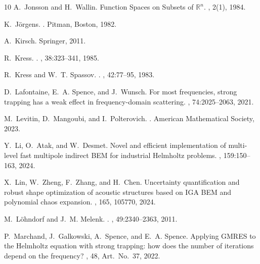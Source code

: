 \documentclass{birkjour}
\theoremstyle{definition}
\theoremstyle{remark}
\numberwithin{equation}{section}
\begin{document}
\begin{thebibliography}{10}
A.~Jonsson and H.~Wallin.
\newblock Function {S}paces on {S}ubsets of {${\mathbb R}^n$}.
, 2(1), 1984.

K.~J\"orgens.
.
\newblock Pitman, Boston, 1982.

A.~Kirsch.
\newblock Springer, 2011.

R.~Kress.
.
, 38:323--341, 1985.

R.~Kress and W.~T. Spassov.
.
, 42:77--95, 1983.

D.~Lafontaine, E.~A. Spence, and J.~Wunsch.
\newblock For most frequencies, strong trapping has a weak effect in
  frequency-domain scattering.
, 74:2025--2063, 2021.

M.~Levitin, D.~Mangoubi, and I.~Polterovich.
.
\newblock American Mathematical Society, 2023.

Y.~Li, O.~Atak, and W.~Desmet.
\newblock Novel and efficient implementation of multi-level fast multipole
  indirect {BEM} for industrial {H}elmholtz problems.
, 159:150--163, 2024.

X.~Lin, W.~Zheng, F.~Zhang, and H.~Chen.
\newblock Uncertainty quantification and robust shape optimization of acoustic
  structures based on {IGA BEM} and polynomial chaos expansion.
, 165, 105770, 2024.

M.~L\"{o}hndorf and J.~M. Melenk.
.
, 49:2340--2363, 2011.

P.~Marchand, J.~Galkowski, A.~Spence, and E.~A. Spence.
\newblock Applying {GMRES} to the {H}elmholtz equation with strong trapping:
  how does the number of iterations depend on the frequency?
, 48, Art.~No.~37, 2022.


\end{thebibliography}
\end{document}

